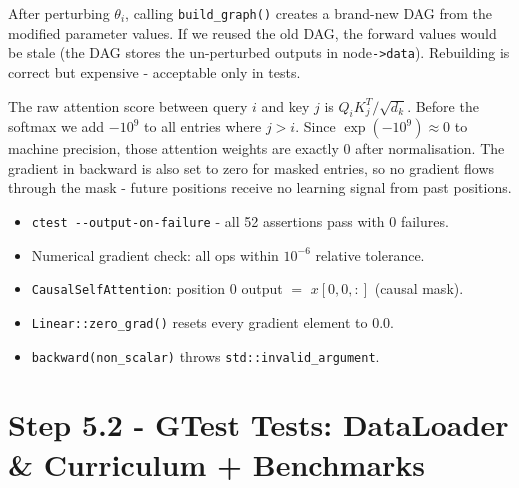 \documentclass[12pt, a4paper]{article}
\begin{document}
\begin{tcolorbox}[interviewbox,
    title={Interview: Why rebuild the computation graph inside check\_gradients?}]
  After perturbing $\theta_i$, calling \texttt{build\_graph()} creates a brand-new
  DAG from the modified parameter values.  If we reused the old DAG, the forward
  values would be stale (the DAG stores the un-perturbed outputs in node\texttt{->data}).
  Rebuilding is correct but expensive - acceptable only in tests.
\end{tcolorbox}

\begin{tcolorbox}[interviewbox,
    title={Interview: How does the causal mask prevent future information leakage?}]
  The raw attention score between query $i$ and key $j$ is
  $Q_i K_j^T / \sqrt{d_k}$.  Before the softmax we add $-10^9$ to all entries
  where $j > i$.  Since $\exp(-10^9) \approx 0$ to machine precision, those
  attention weights are exactly $0$ after normalisation.  The gradient in
  backward is also set to zero for masked entries, so no gradient flows through
  the mask - future positions receive no learning signal from past positions.
\end{tcolorbox}

\begin{tcolorbox}[exitbox, title={Step 5.1 - Exit Criterion (met)}]
  \begin{itemize}
    \item \texttt{ctest -{}-output-on-failure} - all 52 assertions pass with 0
          failures. \checkmark
    \item Numerical gradient check: all ops within $10^{-6}$ relative tolerance. \checkmark
    \item \texttt{CausalSelfAttention}: position 0 output $=$ $x[0,0,:]$ (causal mask). \checkmark
    \item \texttt{Linear::zero\_grad()} resets every gradient element to 0.0. \checkmark
    \item \texttt{backward(non\_scalar)} throws \texttt{std::invalid\_argument}. \checkmark
  \end{itemize}
\end{tcolorbox}

\section{Step 5.2 - GTest Tests: DataLoader \& Curriculum + Benchmarks}
\end{document}
